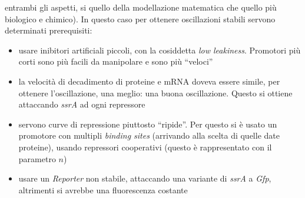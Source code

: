 \documentclass[a4paper,12pt, oneside]{book}
\begin{document}
entrambi gli aspetti, si quello della modellazione matematica che quello più
biologico e chimico). In questo caso per ottenere oscillazioni stabili servono
determinati prerequisiti:
\begin{itemize}
  \item usare inibitori artificiali piccoli, con la cosiddetta \textit{low
    leakiness}. Promotori più corti sono più facili da manipolare e sono più
  ``veloci'' 
  \item la velocità di decadimento di proteine e mRNA doveva essere simile, per
  ottenere l'oscillazione, una meglio: una buona oscillazione. Questo si ottiene
  attaccando \textit{ssrA} ad ogni repressore 
  \item servono curve di repressione piuttosto ``ripide''. Per questo si è
  usato un promotore con multipli \textit{binding sites} (arrivando alla scelta
  di quelle date proteine), usando repressori
  cooperativi (questo è rappresentato con il parametro $n$) 
  \item usare un \textit{Reporter} non stabile, attaccando una variante di
  \textit{ssrA} a \textit{Gfp}, altrimenti si avrebbe una fluorescenza costante
\end{itemize}
\end{document}
